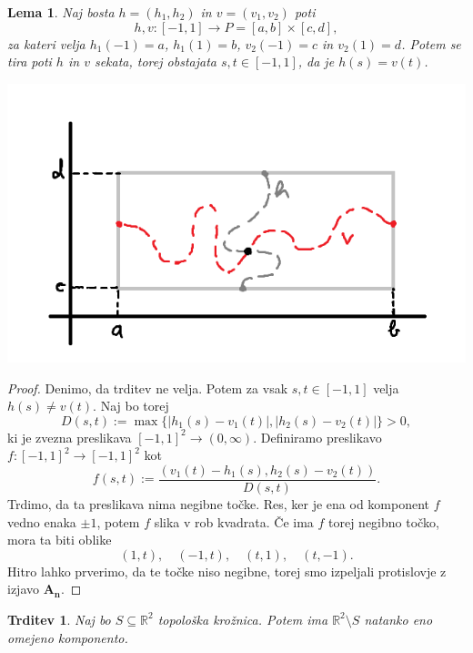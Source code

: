 \documentclass[10pt, a4paper]{article}
\newtheorem{trditev}[izr]{Trditev}
\newtheorem{lema}[izr]{Lema}
\newenvironment{noticeC}{%
  \tcolorbox[%
  notitle,
  empty,
  enhanced,  %
  breakable,
  coltext=black, 
  fontupper=\rmfamily,
  noparskip,
  sharp corners,
  boxrule=-1pt,  %
  frame hidden,
  left=7pt,  %
  right=7pt,
  top=5pt,
  bottom=5pt,
  before skip=2.5ex plus 2pt,
  after skip=2.5ex plus 2pt,
  overlay unbroken and last={%
  },
  ]}
{\endtcolorbox}
\newenvironment{dokaz}%
  {\begin{noticeC}\begin{proof}}%
  {\end{proof}\end{noticeC}}
\newcommand{\R}{\mathbb {R}}
\begin{document}
\begin{lema}
  Naj bosta $h = (h_1, h_2)$ in $v = (v_1, v_2)$ poti 
  $$h, v: [-1, 1] \to P = [a, b] \times [c, d],$$
  za kateri velja $h_1 (-1) = a$, $h_1 (1) = b$, $v_2 (-1) = c$ in $v_2 (1) = d$.
  Potem se tira poti $h$ in $v$ sekata, torej obstajata $s, t \in [-1, 1]$, da je $h(s) = v(t)$.
  \begin{center}
    \includegraphics[scale=0.6]{lema1.png}
  \end{center}
\end{lema}

\begin{dokaz}
  Denimo, da trditev ne velja. Potem za vsak $s, t \in [-1, 1]$ velja $h(s) \neq v(t)$.
  Naj bo torej $$D(s, t) := \max \{|h_1 (s) - v_1 (t)|, |h_2 (s) - v_2 (t)|\} > 0,$$
  ki je zvezna preslikava $[-1, 1]^2 \to (0, \infty)$.
  Definiramo preslikavo $f: [-1, 1]^2 \to [-1, 1]^2$ kot 
  $$f(s, t) := \frac{(v_1 (t) - h_1 (s), h_2 (s) - v_2 (t))}{D(s, t)}.$$
  Trdimo, da ta preslikava nima negibne točke. Res, ker je ena od komponent $f$ vedno enaka $\pm 1$, 
  potem $f$ slika v rob kvadrata. Če ima $f$ torej negibno točko, mora ta biti oblike 
  $$(1, t),\quad (-1, t),\quad (t, 1),\quad (t, -1).$$
  Hitro lahko prverimo, da te točke niso negibne, torej smo izpeljali protislovje z izjavo $\mathbf{A_n}$.
\end{dokaz}

\begin{trditev}
  Naj bo $S \subseteq \R^2$ topološka krožnica. Potem ima $\R^2 \setminus S$ natanko eno omejeno komponento. 
\end{trditev}
\end{document}
